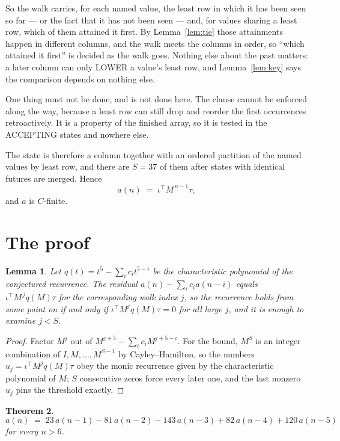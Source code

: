 \documentclass[11pt,a4paper]{article}
\theoremstyle{plain}
\newtheorem{theorem}{Theorem}
\newtheorem{lemma}[theorem]{Lemma}
\theoremstyle{definition}
\begin{document}
So the walk carries, for each named value, the least row in which it has been seen so far ---
or the fact that it has not been seen --- and, for values sharing a least row, which of them
attained it first. By Lemma~\ref{lem:tie} those attainments happen in different columns, and
the walk meets the columns in order, so ``which attained it first'' is decided as the walk
goes. Nothing else about the past matters: a later column can only LOWER a value's least row,
and Lemma~\ref{lem:key} says the comparison depends on nothing else.

One thing must not be done, and is not done here. The clause cannot be enforced along the way,
because a least row can still drop and reorder the first occurrences retroactively. It is a
property of the finished array, so it is tested in the ACCEPTING states and nowhere else.

The state is therefore a column together with an ordered partition of the named values by least
row, and there are $S=37$ of them after states with identical futures are merged. Hence
\[
a(n)\;=\;\iota^{\!\top}M^{\,n-1}\tau,
\]
and $a$ is $C$-finite.

\section{The proof}

\begin{lemma}\label{lem:crit}
Let $q(t)=t^{5}-\sum_i c_it^{5-i}$ be the characteristic polynomial of the
conjectured recurrence. The residual $a(n)-\sum_ic_ia(n-i)$ equals
$\iota^{\!\top}M^{\,j}q(M)\tau$ for the corresponding walk index $j$, so the recurrence
holds from some point on if and only if $\iota^{\!\top}M^{j}q(M)\tau=0$ for all large $j$,
and it is enough to examine $j<S$.
\end{lemma}

\begin{proof}
Factor $M^{j}$ out of $M^{j+5}-\sum_ic_iM^{j+5-i}$. For the bound, $M^{S}$
is an integer combination of $I,M,\dots,M^{S-1}$ by Cayley--Hamilton, so the numbers
$u_j=\iota^{\!\top}M^{j}q(M)\tau$ obey the monic recurrence given by the characteristic
polynomial of $M$; $S$ consecutive zeros force every later one, and the last nonzero $u_j$
pins the threshold exactly.
\end{proof}

\begin{theorem}
\[
a(n)\;=\;23\,a(n-1) - 81\,a(n-2) - 143\,a(n-3) + 82\,a(n-4) + 120\,a(n-5)
\]
for every $n>6$.
\end{theorem}
\end{document}
